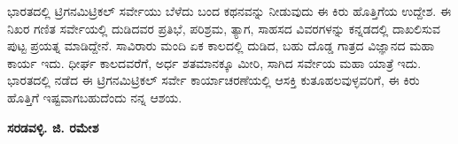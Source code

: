ಭಾರತದಲ್ಲಿ ಟ್ರಿಗನಮಿಟ್ರಿಕಲ್​ ಸರ್ವೇಯು ಬೆಳೆದು ಬಂದ ಕಥನವನ್ನು ನೀಡುವುದು ಈ ಕಿರು ಹೊತ್ತಿಗೆಯ ಉದ್ದೇಶ. ಈ ನಿಖರ ಗಣಿತ ಸರ್ವೇಯಲ್ಲಿ ದುಡಿದವರ ಪ್ರತಿಭೆ, ಪರಿಶ್ರಮ, ತ್ಯಾಗ, ಸಾಹಸದ ವಿವರಗಳನ್ನು ಕನ್ನಡದಲ್ಲಿ ದಾಖಲಿಸುವ ಪುಟ್ಟ ಪ್ರಯತ್ನ ಮಾಡಿದ್ದೇನೆ. ಸಾವಿರಾರು ಮಂದಿ ಏಕ ಕಾಲದಲ್ಲಿ ದುಡಿದ, ಬಹು ದೊಡ್ಡ ಗಾತ್ರದ ವಿಜ್ಞಾನದ ಮಹಾ ಕಾರ್ಯ ಇದು. ಧೀರ್ಘ ಕಾಲದವರೆಗೆ, ಅರ್ಧ ಶತಮಾನಕ್ಕೂ ಮೀರಿ, ಸಾಗಿದ ಸರ್ವೇಯ ಮಹಾ ಯಾತ್ರೆ ಇದು. ಭಾರತದಲ್ಲಿ ನಡೆದ ಈ ಟ್ರಿಗನಮಿಟ್ರಿಕಲ್​ ಸರ್ವೇ ಕಾರ್ಯಾಚರಣೆಯಲ್ಲಿ ಆಸಕ್ತಿ ಕುತೂಹಲವುಳ್ಳವರಿಗೆ, ಈ ಕಿರು ಹೊತ್ತಿಗೆ ಇಷ್ಟವಾಗಬಹುದೆಂದು ನನ್ನ ಆಶಯ.

\begin{flushright}
\textbf{ ಸರಡವಳ್ಳಿ. ಜಿ. ರಮೇಶ}
\end{flushright}

